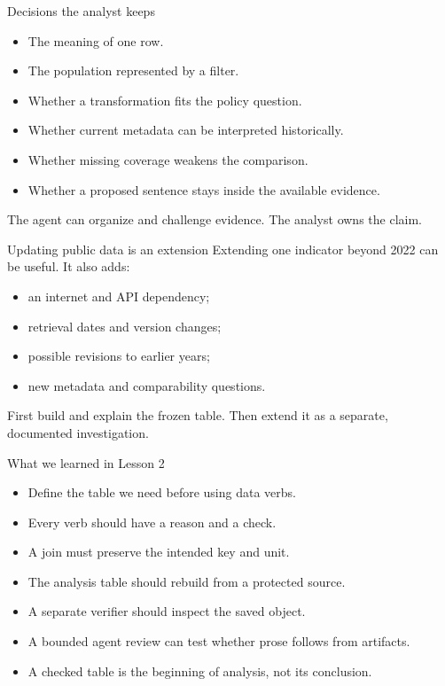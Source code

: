 \begin{frame}{Decisions the analyst keeps}
  \begin{itemize}
    \item The meaning of one row.
    \item The population represented by a filter.
    \item Whether a transformation fits the policy question.
    \item Whether current metadata can be interpreted historically.
    \item Whether missing coverage weakens the comparison.
    \item Whether a proposed sentence stays inside the available evidence.
  \end{itemize}

  \vfill
  The agent can organize and challenge evidence. The analyst owns the claim.
\end{frame}

\begin{frame}{Updating public data is an extension}
  Extending one indicator beyond 2022 can be useful. It also adds:
  \begin{itemize}
    \item an internet and API dependency;
    \item retrieval dates and version changes;
    \item possible revisions to earlier years;
    \item new metadata and comparability questions.
  \end{itemize}

  \vfill
  First build and explain the frozen table. Then extend it as a separate,
  documented investigation.
\end{frame}

\begin{frame}{What we learned in Lesson 2}
  \begin{itemize}
    \item Define the table we need before using data verbs.
    \item Every verb should have a reason and a check.
    \item A join must preserve the intended key and unit.
    \item The analysis table should rebuild from a protected source.
    \item A separate verifier should inspect the saved object.
    \item A bounded agent review can test whether prose follows from artifacts.
    \item A checked table is the beginning of analysis, not its conclusion.
  \end{itemize}
\end{frame}

